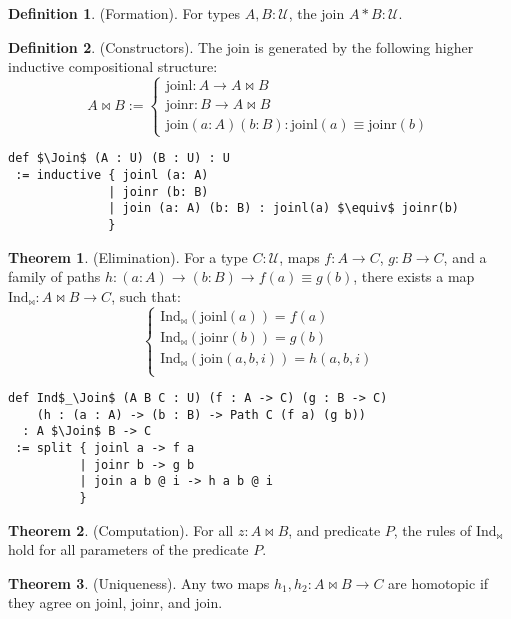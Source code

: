 \documentclass{article}
\theoremstyle{definition}
\newtheorem{theorem}{Theorem}
\newtheorem{definition}{Definition}
\begin{document}
\begin{definition} (Formation).
For types \( A, B : \mathcal{U} \), the join \( A * B : \mathcal{U} \).
\end{definition}

\begin{definition} (Constructors).
The join is generated by the following higher inductive compositional structure:
\[
A \Join B :=
\begin{cases}
\text{joinl} : A \to A \Join B \\
\text{joinr} : B \to A \Join B \\
\text{join} (a : A) (b : B) : \text{joinl}(a) \equiv \text{joinr}(b)
\end{cases}
\]
\begin{lstlisting}[mathescape=true]
def $\Join$ (A : U) (B : U) : U
 := inductive { joinl (a: A)
              | joinr (b: B)
              | join (a: A) (b: B) : joinl(a) $\equiv$ joinr(b)
              }
\end{lstlisting}
\end{definition}

\begin{theorem} (Elimination).
For a type \( C : \mathcal{U} \), maps \( f : A \to C \), \( g : B \to C \),
and a family of paths \( h : (a : A) \to (b : B) \to f(a) \equiv g(b) \),
there exists a map \( \text{Ind}_\Join : A \Join B \to C \), such that:
\[
\begin{cases}
\text{Ind}_\Join(\text{joinl}(a)) = f(a) \\
\text{Ind}_\Join(\text{joinr}(b)) = g(b) \\
\text{Ind}_\Join(\text{join}(a,b,i)) = h(a,b,i) \\
\end{cases}
\]
\begin{lstlisting}[mathescape=true]
def Ind$_\Join$ (A B C : U) (f : A -> C) (g : B -> C)
    (h : (a : A) -> (b : B) -> Path C (f a) (g b))
  : A $\Join$ B -> C
 := split { joinl a -> f a
          | joinr b -> g b
          | join a b @ i -> h a b @ i
          }
\end{lstlisting}
\end{theorem}

\begin{theorem} (Computation).
For all \( z : A \Join B \), and predicate \( P \), the rules of \( \text{Ind}_\Join \) hold for all parameters of the predicate \( P \).
\end{theorem}

\begin{theorem} (Uniqueness).
Any two maps \( h_1, h_2 : A \Join B \to C \) are homotopic
if they agree on \( \text{joinl} \), \( \text{joinr} \), and \( \text{join} \).
\end{theorem}
\end{document}
